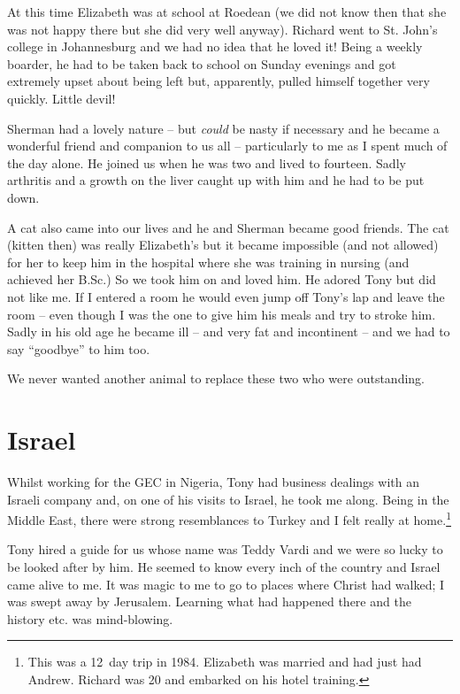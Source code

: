 At this time Elizabeth was at school at Roedean (we did not know then
that she was not happy there but she did very well anyway). Richard
went to St. John's college in Johannesburg and we had no idea that he
loved it! Being a weekly boarder, he had to be taken back to school on
Sunday evenings and got extremely upset about being left but,
apparently, pulled himself together very quickly. Little devil!

Sherman had a lovely nature -- but \textit{could} be nasty if
necessary and he became a wonderful friend and companion to us all --
particularly to me as I spent much of the day alone. He joined us when
he was two and lived to fourteen. Sadly arthritis and a growth on the
liver caught up with him and he had to be put down.

A cat also came into our lives and he and Sherman became good friends.
The cat (kitten then) was really Elizabeth's but it became impossible
(and not allowed) for her to keep him in the hospital where she was
training in nursing (and achieved her B.Sc.) So we took him on and
loved him. He adored Tony but did not like me. If I entered a room he
would even jump off Tony's lap and leave the room -- even though I was
the one to give him his meals and try to stroke him. Sadly in his old
age he became ill -- and very fat and incontinent -- and we had to say
``goodbye'' to him too.

We never wanted another animal to replace these two who were
outstanding.

\clearpage
\thispagestyle{empty}


\chapter{Israel}

Whilst working for the GEC in Nigeria, Tony had business dealings with
an Israeli company and, on one of his visits to Israel, he took me
along. Being in the Middle East, there were strong resemblances to
Turkey and I felt really at home.\footnote{This was a 12~day trip in
  1984. Elizabeth was married and had just had Andrew. Richard was 20
  and embarked on his hotel training.}

Tony hired a guide for us whose name was Teddy Vardi and we were so
lucky to be looked after by him. He seemed to know every inch of the
country and Israel came alive to me. It was magic to me to go to
places where Christ had walked; I was swept away by Jerusalem.
Learning what had happened there and the history etc. was
mind-blowing.

